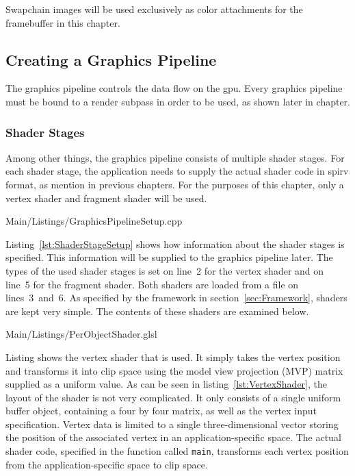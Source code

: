       Swapchain images will be used exclusively as color attachments for the framebuffer in this chapter.

    \subsection{Creating a Graphics Pipeline}
    \label{subsec:GraphicsPipelineSetup}
      The graphics pipeline controls the data flow on the \gls{gpu}.
      Every graphics pipeline must be bound to a render subpass in order to be used, as shown later in chapter.

      \subsubsection{Shader Stages}
      \label{sss:GraphicsPipelineShaderStages}
        Among other things, the graphics pipeline consists of multiple shader stages.
        For each shader stage, the application needs to supply the actual shader code in \gls{spirv} format, as mention in previous chapters.
        For the purposes of this chapter, only a vertex shader and fragment shader will be used.

        
        {Main/Listings/GraphicsPipelineSetup.cpp}

        Listing~\ref{lst:ShaderStageSetup} shows how information about the shader stages is specified.
        This information will be supplied to the graphics pipeline later.
        The types of the used shader stages is set on line~2 for the vertex shader and on line~5 for the fragment shader.
        Both shaders are loaded from a file on lines~3~and~6.
        As specified by the framework in section~\ref{sec:Framework}, shaders are kept very simple.
        The contents of these shaders are examined below.

        
        {Main/Listings/PerObjectShader.glsl}

        Listing shows the vertex shader that is used.
        It simply takes the vertex position and transforms it into clip space using the model view projection (MVP) matrix supplied as a uniform value.
        As can be seen in listing~\ref{lst:VertexShader}, the layout of the shader is not very complicated.
        It only consists of a single uniform buffer object, containing a four by four matrix, as well as the vertex input specification.
        Vertex data is limited to a single three-dimensional vector storing the position of the associated vertex in an application-specific space.
        The actual shader code, specified in the function called \lstinline{main}, transforms each vertex position from the application-specific space to clip space.

